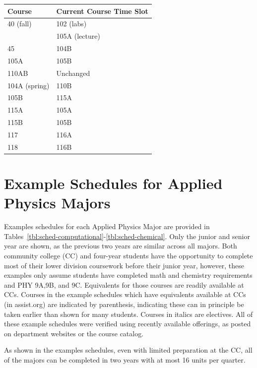 \documentclass[12pt]{article}
\begin{document}
\noindent
\vskip 0.25cm
\begin{center}
\begin{tabular}{|ll|}
\hline
Course    & Current Course Time Slot \\
\hline
40 (fall)     & 102 (labs) \\
              & 105A (lecture) \\
45            & 104B \\
105A          & 105B \\
110AB         & Unchanged \\
104A (spring) & 110B \\
105B          & 115A \\
115A          & 105A \\
115B          & 105B \\
117           & 116A \\
118           & 116B \\
\hline
\end{tabular}
\end{center}


\appendix

\newpage
\section{Example Schedules for Applied Physics Majors}
\label{sec:sched-applied}

Examples schedules for each Applied Physics Major are provided in
Tables~\ref{tbl:sched-computational}-\ref{tbl:sched-chemical}.  Only
the junior and senior year are shown, as the previous two years are
similar across all majors.  Both community college (CC) and four-year
students have the opportunity to complete most of their lower division
coursework before their junior year, however, these examples only
assume students have completed math and chemistry requirements and PHY
9A,9B, and 9C.  Equivalents for those courses are readily available at
CCs.  Courses in the example schedules which have equivalents
available at CCs (in assist.org) are indicated by parenthesis,
indicating these can in principle be taken earlier than shown for many
students.  Courses in italics are electives.  All of these example
schedules were verified using recently available offerings, as posted
on department websites or the course catalog.

As shown in the examples schedules, even with limited preparation at
the CC, all of the majors can be completed in two years with at most
16 units per quarter.
\end{document}
